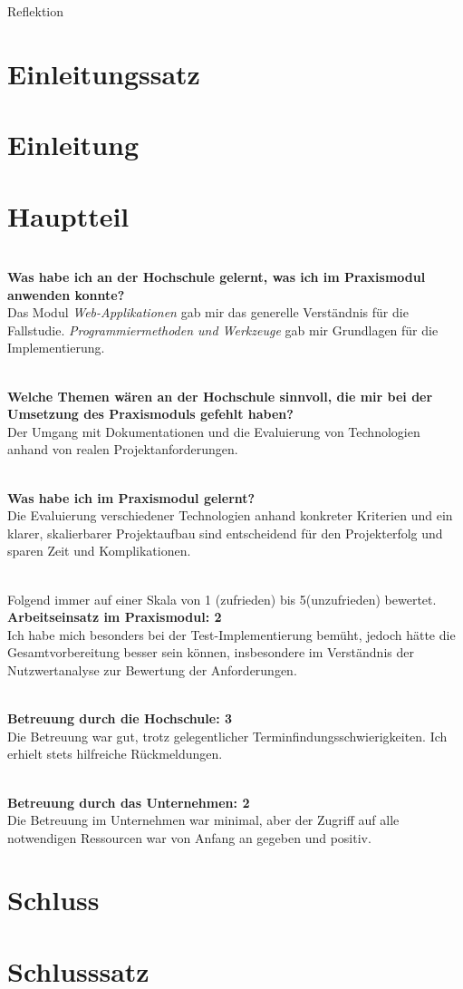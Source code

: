 \documentclass[biblatex]{lni}
\begin{document}
  \begin{center}
    \LARGE Reflektion
  \end{center}

  \section{Einleitungssatz}

  \section{Einleitung}

  \section{Hauptteil}

  \\ \textbf{Was habe ich an der Hochschule gelernt, was ich im Praxismodul anwenden konnte?} \\
  Das Modul \textit{Web-Applikationen} gab mir das generelle Verständnis für die Fallstudie.
  \textit{Programmiermethoden und Werkzeuge} gab mir Grundlagen für die Implementierung.

  \\ \textbf{Welche Themen wären an der Hochschule sinnvoll, die mir bei der Umsetzung des Praxismoduls gefehlt haben?} \\
  Der Umgang mit Dokumentationen und die Evaluierung von Technologien anhand von realen Projektanforderungen.

  \\ \textbf{Was habe ich im Praxismodul gelernt?} \\
  Die Evaluierung verschiedener Technologien anhand konkreter Kriterien und ein klarer,
  skalierbarer Projektaufbau sind entscheidend für den Projekterfolg und sparen Zeit und Komplikationen.

  \\ Folgend immer auf einer Skala von 1 (zufrieden) bis 5(unzufrieden) bewertet.
  \\ \textbf{Arbeitseinsatz im Praxismodul: 2}\\
  Ich habe mich besonders bei der Test-Implementierung bemüht,
  jedoch hätte die Gesamtvorbereitung besser sein können,
  insbesondere im Verständnis der Nutzwertanalyse zur Bewertung der Anforderungen.

  \\ \textbf{Betreuung durch die Hochschule: 3}\\
  Die Betreuung war gut, trotz gelegentlicher Terminfindungsschwierigkeiten.
  Ich erhielt stets hilfreiche Rückmeldungen.

  \\ \textbf{Betreuung durch das Unternehmen: 2}\\
  Die Betreuung im Unternehmen war minimal,
  aber der Zugriff auf alle notwendigen Ressourcen war von Anfang an gegeben und positiv.

  \section{Schluss}

  \section{Schlusssatz}
\end{document}
